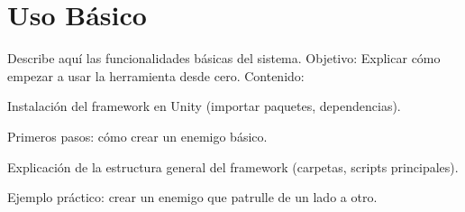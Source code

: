 \section{Uso Básico}
Describe aquí las funcionalidades básicas del sistema.
Objetivo: Explicar cómo empezar a usar la herramienta desde cero.
Contenido:

Instalación del framework en Unity (importar paquetes, dependencias).

Primeros pasos: cómo crear un enemigo básico.

Explicación de la estructura general del framework (carpetas, scripts principales).

Ejemplo práctico: crear un enemigo que patrulle de un lado a otro.